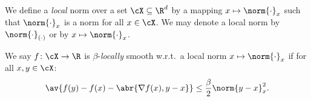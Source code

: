 \begin{definition}\label{def:local_norm}
    We define a \emph{local} norm over a set $\cX\subseteq \R^d$ by a mapping $x \mapsto \norm{\cdot}_x$ such that $\norm{\cdot}_x$ is a norm for all $x\in \cX$.
    We may denote a local norm by $\norm{\cdot}_{(\cdot)}$ or by $x \mapsto \norm{\cdot}_x$.
\end{definition}

\begin{definition}\label{def:local_smoothness}
    We say $f\colon \cX \to \R$ is
    $\beta$-\emph{locally} smooth w.r.t.~a local norm $x \mapsto \norm{\cdot}_x$ if for all $x, y\in \cX$:
    \begin{align*}
    \av{f(y) - f(x) - \abr{\nabla f(x), y - x}} \leq 
    \frac\beta2\norm{y-x}_x^2 .
    \end{align*}
\end{definition}


